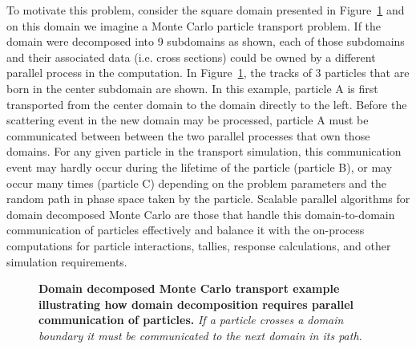 To motivate this problem, consider the square domain presented in
Figure~\ref{fig:ddmc_example} and on this domain we imagine a Monte
Carlo particle transport problem. If the domain were decomposed into 9
subdomains as shown, each of those subdomains and their associated
data (i.e. cross sections) could be owned by a different parallel
process in the computation. In Figure~\ref{fig:ddmc_example}, the
tracks of 3 particles that are born in the center subdomain are
shown. In this example, particle A is first transported from the
center domain to the domain directly to the left. Before the
scattering event in the new domain may be processed, particle A must
be communicated between between the two parallel processes that own
those domains. For any given particle in the transport simulation,
this communication event may hardly occur during the lifetime of the
particle (particle B), or may occur many times (particle C) depending
on the problem parameters and the random path in phase space taken by
the particle. Scalable parallel algorithms for domain decomposed Monte
Carlo are those that handle this domain-to-domain communication of
particles effectively and balance it with the on-process computations
for particle interactions, tallies, response calculations, and other
simulation requirements.
\begin{figure}[t!]
  \begin{center}
    \scalebox{1.5}{
       }
  \end{center}
  \caption{\textbf{Domain decomposed Monte Carlo transport example
      illustrating how domain decomposition requires parallel
      communication of particles.} \textit{If a particle crosses a
      domain boundary it must be communicated to the next domain in
      its path.}}
  \label{fig:ddmc_example}
\end{figure}


